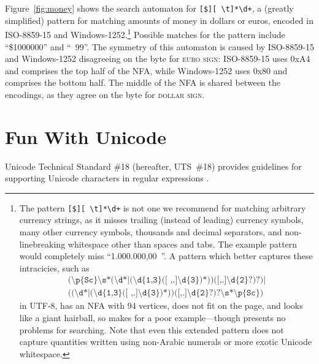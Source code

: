 \documentclass[5p,final,number,sort&compress]{elsarticle}
\newcommand{\re}[1]{\texttt{#1}}
\newcommand*{\whack}{\textbackslash}
\begin{document}
Figure~\ref{fig:money} shows the search automaton for \re{[\texteuro\$][ \whack t]*\whack d+}, a (greatly simplified) pattern for matching amounts of money in dollars or euros, encoded in ISO-8859-15 and Windows-1252.\footnote{The pattern \re{[\texteuro\$][ \whack t]*\whack d+} is not one we recommend for matching arbitrary currency strings, as it misses trailing (instead of leading) currency symbols, many other currency symbols, thousands and decimal separators, and non-linebreaking whitespace other than spaces and tabs. The example pattern would completely miss ``1.000.000,00~\texteuro''. A pattern which better captures these intracicies, such as
\begin{multline*}
  \re{(\whack p\{Sc\}\whack s*(\whack d*|(\whack d\{1,3\}([~,.]\whack d\{3\})*))([,.]\whack d\{2\}?)?)|}
\\
\re{((\whack d*|(\whack d\{1,3\}([~,.]\whack d\{3\})*))([,.]\whack d\{2\}?)?\whack s*\whack p\{Sc\})}
\end{multline*}
in UTF-8, has an NFA with 94 vertices, does not fit on the page, and looks like a giant hairball, so makes for a poor example---though presents no problems for searching. Note that even this extended pattern does not capture quantities written using non-Arabic numerals or more exotic Unicode whitespace.} Possible matches for the pattern include ``\$1000000'' and ``\texteuro\ 99''. The symmetry of this automaton is caused by ISO-8859-15 and Windows-1252 disagreeing on the byte for \textsc{euro sign}: ISO-8859-15 uses 0xA4 and comprises the top half of the NFA, while Windows-1252 uses 0x80 and comprises the bottom half. The middle of the NFA is shared between the encodings, as they agree on the byte for \textsc{dollar sign}.

\section{Fun With Unicode}

Unicode Technical Standard \#18 (hereafter, UTS~\#18) provides guidelines for supporting Unicode characters in regular expressions \citep{uts18}.

\end{document}
